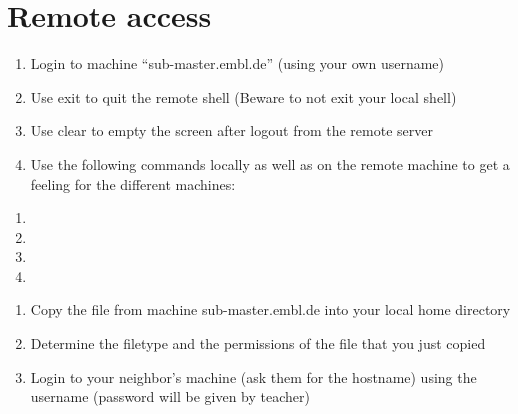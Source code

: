 \documentclass[letterpaper,10pt,english]{sphinxmanual}
\begin{document}
\section{Remote access}
\label{exercises_beginner:remote-access}\begin{enumerate}
\item {} 
Login to machine ``sub-master.embl.de'' (using your own username)

\item {} 
Use exit to quit the remote shell (Beware to not exit your local shell)

\item {} 
Use clear to empty the screen after logout from the remote server

\item {} 
Use the following commands locally as well as on the remote machine to get a feeling for the different machines:

\end{enumerate}
\begin{enumerate}
\item {} 

\item {} 

\item {} 

\item {} 

\end{enumerate}
\begin{enumerate}
\item {} 
Copy the file  from machine sub-master.embl.de into your local home directory

\item {} 
Determine the filetype and the permissions of the file that you just copied

\item {} 
Login to your neighbor's machine (ask them for the hostname) using the username  (password will be given by teacher)

\end{enumerate}
\end{document}
